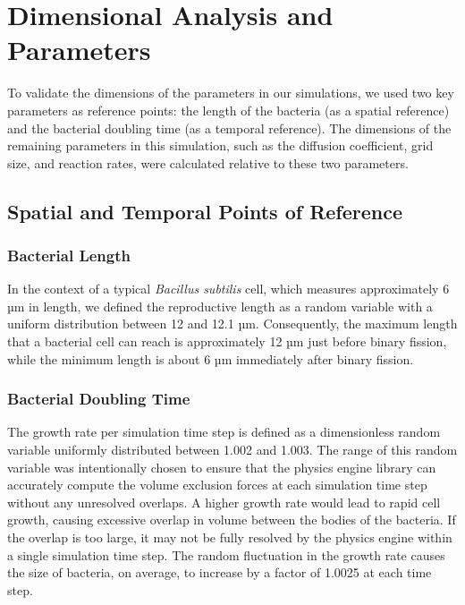 
\chapter{Dimensional Analysis and Parameters}\label{chap:contrib2}

To validate the dimensions of the parameters in our simulations, we used two key parameters as reference points: the length of the bacteria (as a spatial reference) and the bacterial doubling time (as a temporal reference). The dimensions of the remaining parameters in this simulation, such as the diffusion coefficient, grid size, and reaction rates, were calculated relative to these two parameters.

\section{Spatial and Temporal Points of Reference}\label{sec:contrib2:theme1}

\subsection{Bacterial Length}\label{sec:contrib2:theme1:A}

In the context of a typical \textit{Bacillus subtilis} cell, which measures approximately 6 µm in length, we defined the reproductive length as a random variable with a uniform distribution between 12 and 12.1 µm. Consequently, the maximum length that a bacterial cell can reach is approximately 12 µm just before binary fission, while the minimum length is about 6 µm immediately after binary fission.

\subsection{Bacterial Doubling Time}\label{sec:contrib2:theme1:B}

The growth rate per simulation time step is defined as a dimensionless random variable uniformly distributed between 1.002 and 1.003. The range of this random variable was intentionally chosen to ensure that the physics engine library can accurately compute the volume exclusion forces at each simulation time step without any unresolved overlaps. A higher growth rate would lead to rapid cell growth, causing excessive overlap in volume between the bodies of the bacteria. If the overlap is too large, it may not be fully resolved by the physics engine within a single simulation time step. The random fluctuation in the growth rate causes the size of bacteria, on average, to increase by a factor of 1.0025 at each time step.

